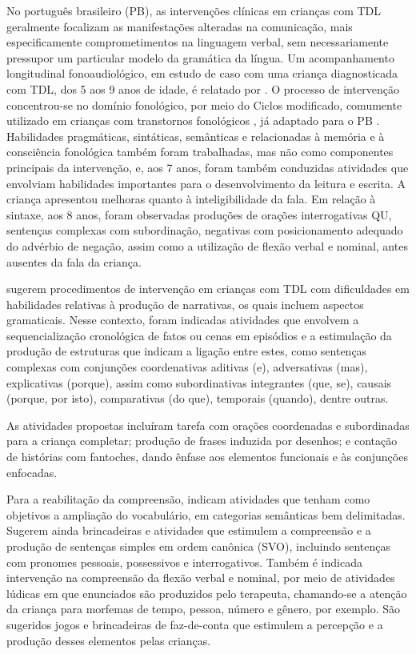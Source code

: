 \documentclass[output=paper,colorlinks,citecolor=brown,booklanguage=portuguese]{langscibook}
\begin{document}
No português brasileiro (PB), as intervenções clínicas em crianças com TDL geralmente focalizam as manifestações alteradas na comunicação, mais especificamente comprometimentos na linguagem verbal, sem necessariamente pressupor um particular modelo da gramática da língua. Um acompanhamento longitudinal fonoaudiológico, em estudo de caso com uma criança diagnosticada com TDL, dos 5 aos 9 anos de idade, é relatado por \citet{Nicolielo2014}. O processo de intervenção concentrou-se no domínio fonológico, por meio do Ciclos modificado, comumente utilizado em crianças com transtornos fonológicos \citep{Tyler1987}, já adaptado para o PB \citep{Mota1990}. Habilidades pragmáticas, sintáticas, semânticas e relacionadas à memória e à consciência fonológica também foram trabalhadas, mas não como componentes principais da intervenção, e, aos 7 anos, foram também conduzidas atividades que envolviam habilidades importantes para o desenvolvimento da leitura e escrita. A criança apresentou melhoras quanto à inteligibilidade da fala. Em relação à sintaxe, aos 8 anos, foram observadas produções de orações interrogativas QU, sentenças complexas com subordinação, negativas com posicionamento adequado do advérbio de negação, assim como a utilização de flexão verbal e nominal, antes ausentes da fala da criança.  

\citet{BefiLopes2013} sugerem procedimentos de intervenção em crianças com TDL com dificuldades em habilidades relativas à produção de narrativas, os quais incluem aspectos gramaticais. Nesse contexto, foram indicadas atividades que envolvem a sequencialização cronológica de fatos ou cenas em episódios e a estimulação da produção de estruturas que indicam a ligação entre estes, como sentenças complexas com conjunções coordenativas aditivas (e), adversativas (mas), explicativas (porque), assim como subordinativas integrantes (que, se), causais (porque, por isto), comparativas (do que), temporais (quando), dentre outras. 

As atividades propostas incluíram tarefa com orações coordenadas e subordinadas para a criança completar; produção de frases induzida por desenhos; e contação de histórias com fantoches, dando ênfase aos elementos funcionais e às conjunções enfocadas. 

Para a reabilitação da compreensão, \citet{BefiLopes2013b} indicam atividades que tenham como objetivos a ampliação do vocabulário, em categorias semânticas bem delimitadas. Sugerem ainda brincadeiras e atividades que estimulem a compreensão e a produção de sentenças simples em ordem canônica (SVO), incluindo sentenças com pronomes pessoais, possessivos e interrogativos. Também é indicada intervenção na compreensão da flexão verbal e nominal, por meio de atividades lúdicas em que enunciados são produzidos pelo terapeuta, chamando-se a atenção da criança para morfemas de tempo, pessoa, número e gênero, por exemplo.  São sugeridos jogos e brincadeiras de faz-de-conta que estimulem a percepção e a produção desses elementos pelas crianças. 
\end{document}
